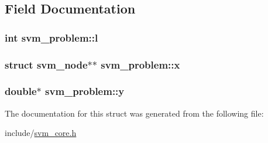 \subsection{Field Documentation}
\subsubsection[{l}]{\setlength{\rightskip}{0pt plus 5cm}int svm\+\_\+problem\+::l}\hypertarget{structsvm__problem_a4350eb6820f0d6126bffb6264cec65b3}{}\label{structsvm__problem_a4350eb6820f0d6126bffb6264cec65b3}
\subsubsection[{x}]{\setlength{\rightskip}{0pt plus 5cm}struct {\bf svm\+\_\+node}$\ast$$\ast$ svm\+\_\+problem\+::x}\hypertarget{structsvm__problem_acddda9b49a8e38bbda079f35c2e18984}{}\label{structsvm__problem_acddda9b49a8e38bbda079f35c2e18984}
\subsubsection[{y}]{\setlength{\rightskip}{0pt plus 5cm}double$\ast$ svm\+\_\+problem\+::y}\hypertarget{structsvm__problem_a59dec12ff090571bc9592ba9fb306780}{}\label{structsvm__problem_a59dec12ff090571bc9592ba9fb306780}


The documentation for this struct was generated from the following file\+:\begin{DoxyCompactItemize}
\item 
include/\hyperlink{svm__core_8h}{svm\+\_\+core.\+h}\end{DoxyCompactItemize}
